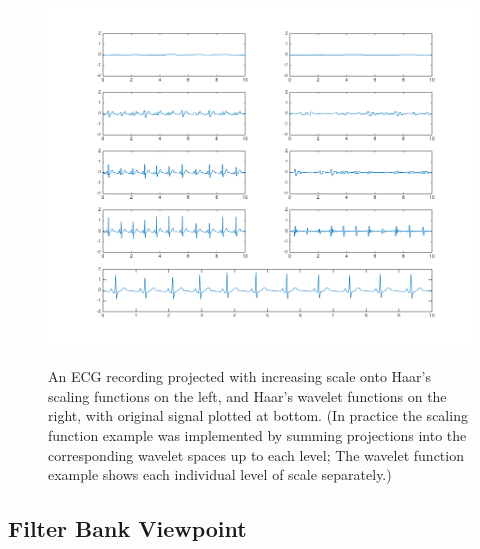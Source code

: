 \documentclass[letterpaper]{article}
\begin{document}
\begin{figure}[h]
  \caption{An ECG recording projected with increasing scale onto Haar's scaling functions on the left,
and Haar's wavelet functions on the right,
with original signal plotted at bottom.
(In practice the scaling function example was implemented by summing projections into the corresponding wavelet spaces up to each level;
The wavelet function example shows each individual level of scale separately.) }
  \centering
    \includegraphics[width=1\textwidth]{figures/ecgboth}
  \label{fig:ecgboth}
\end{figure}

\subsection{Filter Bank Viewpoint}
\end{document}
